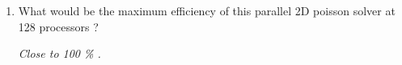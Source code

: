 \documentclass[11pt,a4paper]{article}
\begin{document}
\begin{exercise}

  $~$ %

\begin{enumerate}[label=(\alph*)]
	\item What would be the maximum efficiency of this parallel 2D poisson solver at 128 processors ?

{\it
	Close to 100 \% .
}	


\end{enumerate}
  

\end{exercise}
\end{document}
